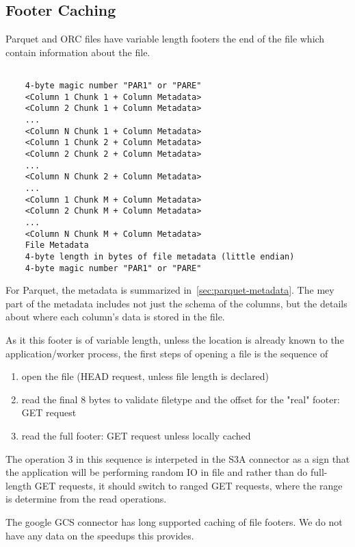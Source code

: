 \documentclass[manuscript]{acmart}
\begin{document}
\subsection{Footer Caching}\label{subsec:footer-caching}

Parquet and ORC files have variable length footers the end of the file which contain
information about the file.

\begin{verbatim}

    4-byte magic number "PAR1" or "PARE"
    <Column 1 Chunk 1 + Column Metadata>
    <Column 2 Chunk 1 + Column Metadata>
    ...
    <Column N Chunk 1 + Column Metadata>
    <Column 1 Chunk 2 + Column Metadata>
    <Column 2 Chunk 2 + Column Metadata>
    ...
    <Column N Chunk 2 + Column Metadata>
    ...
    <Column 1 Chunk M + Column Metadata>
    <Column 2 Chunk M + Column Metadata>
    ...
    <Column N Chunk M + Column Metadata>
    File Metadata
    4-byte length in bytes of file metadata (little endian)
    4-byte magic number "PAR1" or "PARE"
\end{verbatim}

For Parquet, the metadata is summarized in~\ref{sec:parquet-metadata}.
The mey part of the metadata includes not just the schema of
the columns, but the details about where each column's data is stored
in the file.

As it this footer is of variable length, unless the location is already known
to the application/worker process, the first steps of opening a file
is the sequence of

\begin{enumerate}
  \item{open the file (HEAD request, unless file length is declared)}
  \item{read the final 8 bytes to validate filetype and the offset for the "real" footer: GET request}
  \item{read the full footer: GET request unless locally cached}
\end{enumerate}

The operation 3 in this sequence is interpeted in the S3A connector as a sign
that the application will be performing random IO in file and rather than do full-length GET requests,
it should switch to ranged GET requests, where the range is determine from the read operations.

The google GCS connector has long supported caching of file footers.
We do not have any data on the speedups this provides.
\end{document}
